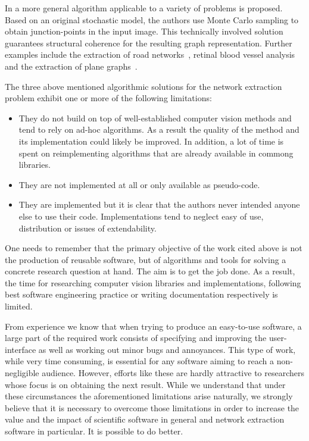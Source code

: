 	In \cite{chai2013recovering} a more general algorithm applicable to a variety of problems is proposed. Based on an original stochastic model, the authors use Monte Carlo sampling to obtain junction-points in the input image. This technically involved solution guarantees structural coherence for the resulting graph representation. Further examples include the extraction of road networks~\cite{nglt2006}, retinal blood vessel analysis~\cite{krause2013fast} and the extraction of plane graphs~\cite{hewrw2010}.

	The three above mentioned algorithmic solutions for the network extraction problem exhibit one or more of the following	limitations: 

	\begin{itemize}
		\item They do not build on top of well-established computer vision methods and tend to rely on ad-hoc algorithms. As a result the quality of the method and its implementation could likely be improved. In addition, a lot of time is spent on reimplementing algorithms that are already available in commong libraries. 

		\item They are not implemented at all or only available as pseudo-code.

		\item They are implemented but it is clear that the authors never intended anyone else to use their code. Implementations tend to neglect easy of use, distribution or issues of extendability.
	\end{itemize}

	One needs to remember that the primary objective of the work cited above is not the production of reusable software, but of algorithms and tools for solving a concrete research question at hand. The aim is to get the job done. As a result, the time for researching computer vision libraries and implementations, following best software engineering practice or writing documentation respectively is limited. 

	From experience we know that when trying to produce an easy-to-use software, a large part of the required work consists of specifying and improving the user-interface as well as working out minor bugs and annoyances. This type of work, while very time consuming, is essential for any software aiming to reach a non-negligible audience. However, efforts like these are hardly attractive to researchers whose focus is on obtaining the next result. While we understand that under these circumstances the aforementioned limitations arise naturally, we strongly believe that it is necessary to overcome those limitations in order to increase the value and the impact of scientific software in general and network extraction software in particular. It is possible to do better.

